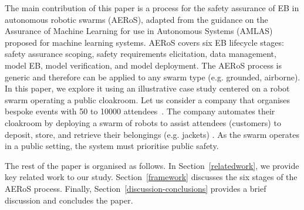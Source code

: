 \documentclass[runningheads]{llncs}
\begin{document}
The main contribution of this paper is a process for the safety assurance of EB in autonomous robotic swarms (AERoS), adapted from the guidance on the Assurance of Machine Learning for use in Autonomous Systems (AMLAS)~\cite{Hawkins2021} proposed for machine learning systems. 
AERoS covers six EB lifecycle stages: safety assurance scoping, safety requirements elicitation, data management, model EB, model verification, and model deployment. 
The AERoS process is generic and therefore can be applied to any swarm type (e.g. grounded, airborne). 
In this paper, we explore it using an illustrative case study centered on a robot swarm operating a public cloakroom. 
Let us consider a company that organises bespoke events with 50 to 10000 attendees~\cite{Jones2020}. 
The company automates their cloakroom by deploying a swarm of robots to assist attendees (customers) to deposit, store, and retrieve their belongings (e.g. jackets) \cite{Jones2020}. 
As the swarm operates in a public setting, the system must prioritise public safety. 

The rest of the paper is organised as follows. 
In Section~\ref{relatedwork}, we provide key related work to our study. Section~\ref{framework} discusses the six stages of the AERoS process. Finally, Section~\ref{discussion-conclusions} provides a brief discussion and concludes the paper. 

\end{document}
